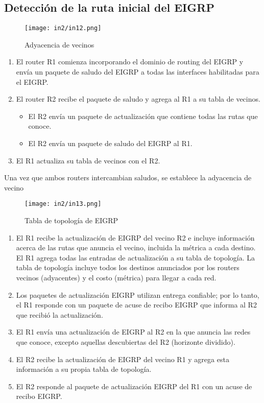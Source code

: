 \documentclass[
	12pt, %
	fleqn, %
	a4paper, %
	oneside, %
]{LegrandOrangeBook}
\begin{document}
\subsection{Detección de la ruta inicial del EIGRP}
\begin{figure}[H]
\centering
\texttt{[image: in2/in12.png]}
\caption{Adyacencia de vecinos}
\end{figure}
\begin{enumerate}
\item El router R1 comienza incorporando el dominio  de routing del EIGRP y envía un paquete de  saludo del EIGRP a todas las interfaces  habilitadas para el EIGRP.
\item El router R2 recibe el paquete de saludo y
agrega al R1 a su tabla de vecinos.
\begin{itemize}
\item El R2 envía un paquete de actualización que  contiene todas las rutas que conoce.
\item El R2 envía un paquete de saludo del EIGRP al R1.
\end{itemize}
\item El R1 actualiza su tabla de vecinos con el R2.
\end{enumerate}
Una vez que ambos routers intercambian saludos, se establece la adyacencia de vecino
\begin{figure}[H]
\centering
\texttt{[image: in2/in13.png]}
\caption{Tabla de topología de EIGRP}
\end{figure}
\begin{enumerate}
\item El R1 recibe la actualización de EIGRP del vecino R2 e incluye información acerca de las rutas que anuncia el vecino, incluida la métrica a cada destino. El R1 agrega todas las entradas de actualización a su tabla de topología. La tabla de topología incluye todos los destinos anunciados por los routers vecinos (adyacentes) y el costo (métrica) para llegar a cada red.
\item Los paquetes de actualización EIGRP utilizan entrega confiable; por lo tanto, el R1 responde con un paquete de acuse de recibo EIGRP que informa al R2 que recibió la actualización.
\item El R1 envía una actualización de EIGRP al R2 en la que anuncia las redes que conoce, excepto aquellas descubiertas del R2 (horizonte dividido).
\item El R2 recibe la actualización de EIGRP del vecino R1 y agrega esta información a su propia tabla de topología.
\item El R2 responde al paquete de actualización EIGRP del R1 con un acuse de recibo EIGRP.
\end{enumerate}
\end{document}
